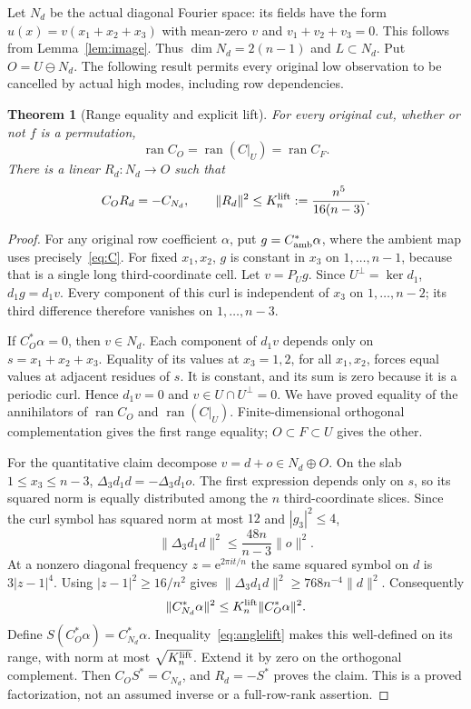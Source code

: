 \documentclass[11pt]{article}
\newcommand{\norm}[1]{\lVert#1\rVert}
\newcommand{\e}{\mathrm e}
\DeclareMathOperator{\ran}{ran}
\newtheorem{theorem}{Theorem}[section]
\theoremstyle{definition}
\theoremstyle{remark}
\begin{document}
Let $N_d$ be the actual diagonal Fourier space: its fields have the form
$u(x)=v(x_1+x_2+x_3)$ with mean-zero $v$ and $v_1+v_2+v_3=0$. This follows
from Lemma~\ref{lem:image}. Thus $\dim N_d=2(n-1)$ and $L\subset N_d$.
Put $O=U\ominus N_d$. The following result permits every original low
observation to be cancelled by actual high modes, including row dependencies.

\begin{theorem}[Range equality and explicit lift]\label{thm:range}
For every original cut, whether or not $f$ is a permutation,
\[
       \ran C_O=\ran(C|_U)=\ran C_F.
\]
There is a linear $R_d:N_d\to O$ such that
\[
 C_OR_d=-C_{N_d},\qquad
 \norm{R_d}^2\le K_n^{\rm lift}:=\frac{n^5}{16(n-3)}.
\]
\end{theorem}
\begin{proof}
For any original row coefficient $\alpha$, put $g=C_{\rm amb}^*\alpha$,
where the ambient map uses precisely~\eqref{eq:C}. For fixed $x_1,x_2$,
$g$ is constant in $x_3$ on $1,\ldots,n-1$, because that is a single long
third-coordinate cell. Let $v=P_Ug$. Since $U^\perp=\ker d_1$,
$d_1g=d_1v$. Every component of this curl is independent of $x_3$ on
$1,\ldots,n-2$; its third difference therefore vanishes on $1,\ldots,n-3$.

If $C_O^*\alpha=0$, then $v\in N_d$. Each component of $d_1v$ depends
only on $s=x_1+x_2+x_3$. Equality of its values at $x_3=1,2$, for all
$x_1,x_2$, forces equal values at adjacent residues of $s$. It is constant,
and its sum is zero because it is a periodic curl. Hence $d_1v=0$ and
$v\in U\cap U^\perp=0$. We have proved equality of the annihilators of
$\ran C_O$ and $\ran(C|_U)$. Finite-dimensional orthogonal complementation
gives the first range equality; $O\subset F\subset U$ gives the other.

For the quantitative claim decompose $v=d+o\in N_d\oplus O$. On the slab
$1\le x_3\le n-3$, $\Delta_3d_1d=-\Delta_3d_1o$. The first expression
depends only on $s$, so its squared norm is equally distributed among
the $n$ third-coordinate slices. Since the curl symbol has squared norm
at most $12$ and $|g_3|^2\le4$,
\[
 \norm{\Delta_3d_1d}^2\le\frac{48n}{n-3}\norm{o}^2.
\]
At a nonzero diagonal frequency $z=\e^{2\pi it/n}$ the same squared symbol
on $d$ is $3|z-1|^4$. Using $|z-1|^2\ge16/n^2$ gives
$\norm{\Delta_3d_1d}^2\ge768n^{-4}\norm d^2$. Consequently
\begin{equation}\label{eq:anglelift}
       \norm{C_{N_d}^*\alpha}^2
       \le K_n^{\rm lift}\norm{C_O^*\alpha}^2.
\end{equation}
Define $S(C_O^*\alpha)=C_{N_d}^*\alpha$. Inequality~\eqref{eq:anglelift}
makes this well-defined on its range, with norm at most $\sqrt{K_n^{\rm lift}}$.
Extend it by zero on the orthogonal complement. Then $C_OS^*=C_{N_d}$,
and $R_d=-S^*$ proves the claim. This is a proved factorization, not an
assumed inverse or a full-row-rank assertion.
\end{proof}
\end{document}
